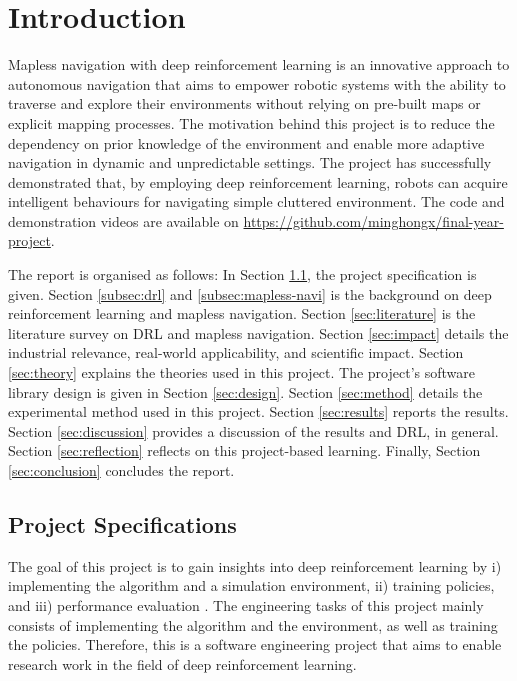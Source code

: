 \newpage
\section{Introduction}

Mapless navigation with deep reinforcement learning is an innovative approach to autonomous navigation that aims to empower robotic systems with the ability to traverse and explore their environments without relying on pre-built maps or explicit mapping processes. The motivation behind this project is to reduce the dependency on prior knowledge of the environment and enable more adaptive navigation in dynamic and unpredictable settings. The project has successfully demonstrated that, by employing deep reinforcement learning, robots can acquire intelligent behaviours for navigating simple cluttered environment. The code and demonstration videos are available on \url{https://github.com/minghongx/final-year-project}.

The report is organised as follows: 
In Section \ref{subsec:spec}, the project specification is given.
Section \ref{subsec:drl} and \ref{subsec:mapless-navi} is the background on deep reinforcement learning and mapless navigation.
Section \ref{sec:literature} is the literature survey on DRL and mapless navigation.
Section \ref{sec:impact} details the industrial relevance, real-world applicability, and scientific impact.
Section \ref{sec:theory} explains the theories used in this project.
The project's software library design is given in Section \ref{sec:design}.
Section \ref{sec:method} details the experimental method used in this project.
Section \ref{sec:results} reports the results.
Section \ref{sec:discussion} provides a discussion of the results and DRL, in general.
Section \ref{sec:reflection} reflects on this project-based learning.
Finally, Section \ref{sec:conclusion} concludes the report.



\subsection{Project Specifications} \label{subsec:spec}

The goal of this project is to gain insights into deep reinforcement learning by i) implementing the algorithm and a simulation environment, ii) training policies, and iii) performance evaluation \cite{ref:spec-report}. The engineering tasks of this project mainly consists of implementing the algorithm and the environment, as well as training the policies. Therefore, this is a software engineering project that aims to enable research work in the field of deep reinforcement learning.

